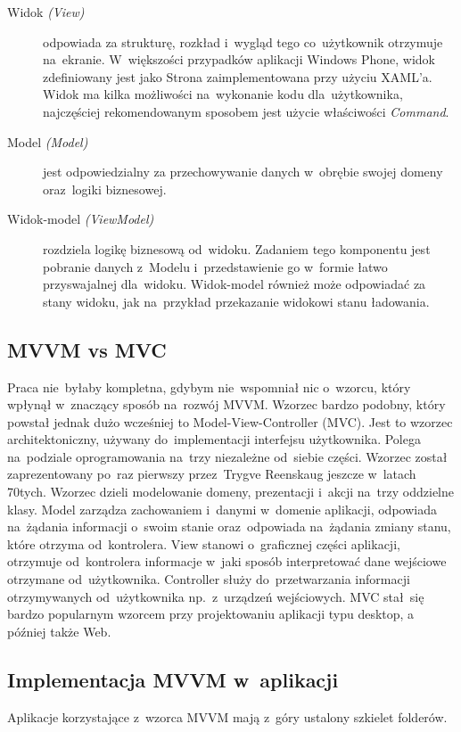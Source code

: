 \documentclass[a4paper,twoside,titlepage,openright]{book}
\begin{document}
\begin{description}

	\item[Widok \textit{(View)}] odpowiada za strukturę, rozkład i~wygląd tego co~użytkownik otrzymuje na~ekranie. W~większości przypadków aplikacji Windows Phone, widok zdefiniowany jest jako Strona zaimplementowana przy użyciu XAML’a. Widok ma kilka możliwości na~wykonanie kodu dla~użytkownika, najczęściej rekomendowanym sposobem jest użycie właściwości \textit{Command}.
	
	\item[Model \textit{(Model)}] jest odpowiedzialny za przechowywanie danych w~obrębie swojej domeny oraz~logiki biznesowej.
	
	\item[Widok-model \textit{(ViewModel)}] rozdziela logikę biznesową od~widoku. Zadaniem tego komponentu jest pobranie danych z~Modelu i~przedstawienie go w~formie łatwo przyswajalnej dla~widoku. Widok-model również może odpowiadać za stany widoku, jak na~przykład przekazanie widokowi stanu ładowania.

\end{description}


\subsection{MVVM vs MVC}

Praca nie~byłaby kompletna, gdybym nie~wspomniał nic o~wzorcu, który wpłynął w~znaczący sposób na~rozwój MVVM. Wzorzec bardzo podobny, który powstał jednak dużo wcześniej to Model-View-Controller (MVC). Jest to wzorzec architektoniczny, używany do~implementacji interfejsu użytkownika. Polega na~podziale oprogramowania na~trzy niezależne od~siebie części. Wzorzec został zaprezentowany po~raz pierwszy przez~Trygve Reenskaug jeszcze w~latach 70tych. \cite{mvcXerox} Wzorzec dzieli modelowanie domeny, prezentacji i~akcji na~trzy oddzielne klasy. Model zarządza zachowaniem i~danymi w~domenie aplikacji, odpowiada na~żądania informacji o~swoim stanie oraz~odpowiada na~żądania zmiany stanu, które otrzyma od~kontrolera. View stanowi o~graficznej części aplikacji, otrzymuje od~kontrolera informacje w~jaki sposób interpretować dane wejściowe otrzymane od~użytkownika. Controller służy do~przetwarzania informacji otrzymywanych od~użytkownika np.~z~urządzeń wejściowych. MVC stał~się bardzo popularnym wzorcem przy projektowaniu aplikacji typu desktop, a później także Web. 


\subsection{Implementacja MVVM w~aplikacji}
Aplikacje korzystające z~wzorca MVVM mają z~góry ustalony szkielet folderów.
\end{document}

